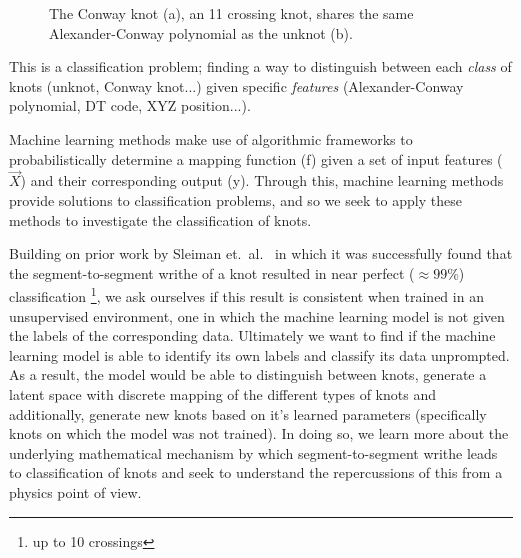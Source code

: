 \begin{figure}[h]%
    \centering
    \qquad
    \caption{The Conway knot (a), an 11 crossing knot, shares the same Alexander-Conway polynomial as the unknot (b).}%
    \label{knot_comp}%
\end{figure}

This is a classification problem; finding a way to distinguish between each \emph{class} of knots (unknot, Conway knot...) given specific \emph{features} (Alexander-Conway polynomial, DT code, XYZ position...).

Machine learning methods make use of algorithmic frameworks to probabilistically determine a mapping function (f) given a set of input features ($\vec{X}$) and their corresponding output (y). Through this, machine learning methods provide solutions to classification problems, and so we seek to apply these methods to investigate the classification of knots.

Building on prior work by Sleiman et.\ al.\ \cite{sleiman2022geometric} in which it was successfully found that the segment-to-segment writhe of a knot resulted in near perfect ($\approx99\%$) classification \footnote{up to 10 crossings}, we ask ourselves if this result is consistent when trained in an unsupervised environment, one in which the machine learning model is not given the labels of the corresponding data. Ultimately we want to find if the machine learning model is able to identify its own labels and classify its data unprompted. As a result, the model would be able to distinguish between knots, generate a latent space with discrete mapping of the different types of knots and additionally, generate new knots based on it's learned parameters (specifically knots on which the model was not trained). 
In doing so, we learn more about the underlying mathematical mechanism by which segment-to-segment writhe leads to classification of knots and seek to understand the repercussions of this from a physics point of view.


